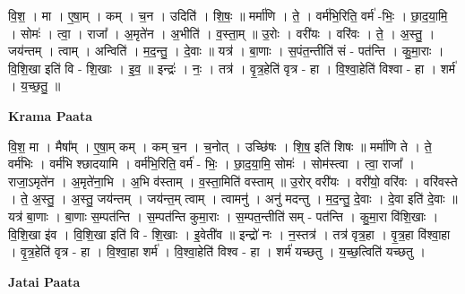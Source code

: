 \documentclass[17pt]{extarticle}
\begin{document}
वि॒श॒ । मा । ए॒षा॒म् । कम् । च॒न । उदिति॑ । शि॒षः॒ ॥ मर्मा॑णि । ते॒ । वर्म॑भि॒रिति॒ वर्म॑ -भिः॒ । छा॒द॒या॒मि॒ । सोमः॑ । त्वा॒ । राजा᳚ । अ॒मृते॑न । अ॒भीति॑ । व॒स्ता॒म् ॥ उ॒रोः । वरी॑यः । वरि॑वः । ते॒ । अ॒स्तु॒ । जय॑न्तम् । त्वाम् । अन्विति॑ । म॒द॒न्तु॒ । दे॒वाः ॥ यत्र॑ । बा॒णाः । स॒पंत॒न्तीति॑ सं - पत॑न्ति । कु॒मा॒राः । वि॒शि॒खा इति॑ वि - शि॒खाः । इ॒व॒ ॥ इन्द्रः॑ । नः॒ । तत्र॑ । वृ॒त्र॒हेति॑ वृत्र - हा । वि॒श्वा॒हेति॑ विश्वा - हा । शर्म॑ । य॒च्छ॒तु॒ ॥  \newline


\textbf{Krama Paata} \newline

वि॒श॒ मा । मैषा᳚म् । ए॒षा॒म् कम् । कम् च॒न । च॒नोत् । उच्छि॑षः । शि॒ष॒ इति॑ शिषः ॥ मर्मा॑णि ते । ते॒ वर्म॑भिः । वर्म॑भि श्छादयामि । वर्म॑भि॒रिति॒ वर्म॑ - भिः॒ । छा॒द॒या॒मि॒ सोमः॑ । सोम॑स्त्वा । त्वा॒ राजा᳚ । राजा॒ऽमृते॑न । अ॒मृते॑ना॒भि । अ॒भि व॑स्ताम् । व॒स्ता॒मिति॑ वस्ताम् ॥ उ॒रोर् वरी॑यः । वरी॑यो॒ वरि॑वः । वरि॑वस्ते । ते॒ अ॒स्तु॒ । अ॒स्तु॒ जय॑न्तम् । जय॑न्त॒म् त्वाम् । त्वामनु॑ । अनु॑ मदन्तु । म॒द॒न्तु॒ दे॒वाः । दे॒वा इति॑ दे॒वाः ॥ यत्र॑ बा॒णाः । बा॒णाः स॒म्पत॑न्ति । स॒म्पत॑न्ति कुमा॒राः । स॒म्पत॒न्तीति॑ सम् - पत॑न्ति । कु॒मा॒रा वि॑शि॒खाः । वि॒शि॒खा इ॑व । वि॒शि॒खा इति॑ वि - शि॒खाः । इ॒वेती॑व ॥ इन्द्रो॑ नः । न॒स्तत्र॑ । तत्र॑ वृत्र॒हा । वृ॒त्र॒हा वि॑श्वा॒हा । वृ॒त्र॒हेति॑ वृत्र - हा । वि॒श्वा॒हा शर्म॑ । वि॒श्वा॒हेति॑ विश्व - हा । शर्म॑ यच्छतु । य॒च्छ॒त्विति॑ यच्छतु । \newline

\textbf{Jatai Paata} \newline
\end{document}
